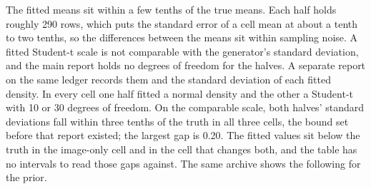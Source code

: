 The fitted means sit within a few tenths of the true means.
Each half holds roughly 290 rows, which puts the standard error of a cell mean at about a tenth to two tenths, so the differences between the means sit within sampling noise.
A fitted Student-t scale is not comparable with the generator's standard deviation, and the main report holds no degrees of freedom for the halves. A separate report on the same ledger records them and the standard deviation of each fitted density. In every cell one half fitted a normal density and the other a Student-t with 10 or 30 degrees of freedom. On the comparable scale, both halves' standard deviations fall within three tenths of the truth in all three cells, the bound set before that report existed; the largest gap is 0.20. The fitted values sit below the truth in the image-only cell and in the cell that changes both, and the table has no intervals to read those gaps against.
The same archive shows the following for the prior.
